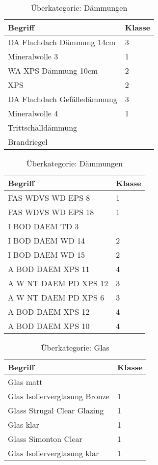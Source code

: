 \begin{table}[h]
	\label{t:evaluation-example13}
	\centering
	\begin{tabular}{|p{}|p{}|}
		\hline
		\textbf{Begriff} & \textbf{Klasse} \\ \hline
		   DA Flachdach Dämmung 14cm & 3 \\ \hline
		Mineralwolle 3 & 1 \\ \hline
		WA XPS Dämmung 10cm & 2 \\ \hline
		XPS & 2 \\ \hline
		DA Flachdach Gefälledämmung & 3 \\ \hline
		Mineralwolle 4 & 1 \\ \hline
		Trittschalldämmung & ~ \\ \hline
		Brandriegel & ~ \\ \hline
	\end{tabular}
	\caption{Überkategorie: Dämmungen}
\end{table}

\begin{table}[h]
	\label{t:evaluation-example14}
	\centering
	\begin{tabular}{|p{}|p{}|}
		\hline
		\textbf{Begriff} & \textbf{Klasse} \\ \hline
		 FAS WDVS WD EPS 8 & 1 \\ \hline
		FAS WDVS WD EPS 18 & 1 \\ \hline
		I BOD DAEM TD 3 & ~ \\ \hline
		I BOD DAEM WD 14 & 2 \\ \hline
		I BOD DAEM WD 15 & 2 \\ \hline
		A BOD DAEM XPS 11 & 4 \\ \hline
		A W NT DAEM PD XPS 12 & 3 \\ \hline
		A W NT DAEM PD XPS 6 & 3 \\ \hline
		A BOD DAEM XPS 12 & 4 \\ \hline
		A BOD DAEM XPS 10 & 4 \\ \hline
	\end{tabular}
	\caption{Überkategorie: Dämmungen}
\end{table}

\begin{table}[h]
	\label{t:evaluation-example15}
	\centering
	\begin{tabular}{|p{}|p{}|}
		\hline
		\textbf{Begriff} & \textbf{Klasse} \\ \hline
		Glas matt & ~ \\ \hline
		Glas Isolierverglasung Bronze & 1 \\ \hline
		Glass Strugal Clear Glazing & 1 \\ \hline
		Glas klar & 1 \\ \hline
		Glass Simonton Clear & 1 \\ \hline
		Glas Isolierverglasung klar & 1 \\ \hline
	\end{tabular}
	\caption{Überkategorie: Glas}
\end{table}

